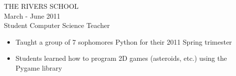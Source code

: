 \documentclass[11pt]{res} %
\begin{document}
\begin{resume}
\begin{itemize}
   \end{itemize}

THE RIVERS SCHOOL \\
March - June 2011 \\
Student Computer Science Teacher
\vspace{0.02in}
   \begin{itemize} \itemsep -2pt  %
   \item Taught a group of 7 sophomores Python for their 2011 Spring trimester
   \item Students learned how to program 2D games (asteroids, etc.) using the Pygame library
 \end{itemize}


\end{resume}
\end{document}
